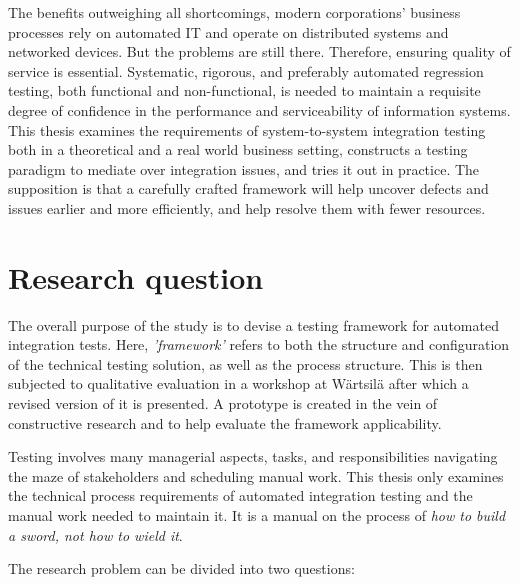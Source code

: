 \documentclass[12pt,a4paper,oneside,pdftex]{report}
\begin{document}
The benefits outweighing all shortcomings, modern corporations' business processes rely on automated IT and operate on distributed systems and networked devices. But the problems are still there. Therefore, ensuring quality of service is essential. Systematic, rigorous, and preferably automated regression testing, both functional and non-functional, is needed to maintain a requisite degree of confidence in the performance and serviceability of information systems. This thesis examines the requirements of system-to-system integration testing both in a theoretical and a real world business setting, constructs a testing paradigm to mediate over integration issues, and tries it out in practice. The supposition is that a carefully crafted framework will help uncover defects and issues earlier and more efficiently, and help resolve them with fewer resources.


\section{Research question}

The overall purpose of the study is to devise a testing framework for automated integration tests. Here, \emph{'framework'} refers to both the structure and configuration of the technical testing solution, as well as the process structure. This is then subjected to qualitative evaluation in a workshop at Wärtsilä after which a revised version of it is presented. A prototype is created in the vein of constructive research and to help evaluate the framework applicability.

Testing involves many managerial aspects, tasks, and responsibilities navigating the maze of stakeholders and scheduling manual work. This thesis only examines the technical process requirements of automated integration testing and the manual work needed to maintain it. It is a manual on the process of \emph{how to build a sword, not how to wield it}.

The research problem can be divided into two questions: \\
\end{document}

